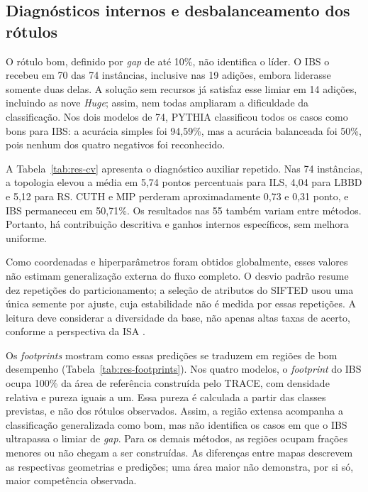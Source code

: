 \FloatBarrier
\subsection{Diagnósticos internos e desbalanceamento dos rótulos}
\label{sec:res-isa-diagnosticos}

O rótulo bom, definido por \textit{gap} de até 10\%, não identifica o líder.
O IBS o recebeu em 70 das 74 instâncias, inclusive nas 19 adições, embora
liderasse somente duas delas. A solução sem recursos já satisfaz esse
limiar em 14 adições, incluindo as nove \textit{Huge}; assim, nem todas
ampliaram a dificuldade da classificação. Nos dois modelos de 74,
PYTHIA classificou todos os casos como bons para IBS: a acurácia simples
foi 94,59\%, mas a acurácia balanceada foi 50\%, pois nenhum dos quatro
negativos foi reconhecido.

A Tabela~\ref{tab:res-cv} apresenta o diagnóstico auxiliar repetido.
Nas 74 instâncias, a topologia elevou a média em 5,74 pontos percentuais
para ILS, 4,04 para LBBD e 5,12 para RS. CUTH e MIP perderam aproximadamente
0,73 e 0,31 ponto, e IBS permaneceu em 50,71\%. Os resultados nas 55
também variam entre métodos. Portanto, há contribuição descritiva e ganhos
internos específicos, sem melhora uniforme.



Como coordenadas e hiperparâmetros foram obtidos globalmente, esses valores
não estimam generalização externa do fluxo completo. O desvio padrão
resume dez repetições do particionamento; a seleção de atributos do SIFTED
usou uma única semente por ajuste, cuja estabilidade não é medida por essas
repetições. A leitura deve considerar
a diversidade da base, não apenas altas taxas de acerto, conforme a
perspectiva da ISA \cite{SmithMilesMunoz2023}.

Os \textit{footprints} mostram como essas predições se traduzem em regiões
de bom desempenho (Tabela~\ref{tab:res-footprints}). Nos quatro modelos,
o \textit{footprint} do IBS ocupa 100\% da área de referência construída pelo TRACE,
com densidade relativa e pureza iguais a um. Essa pureza é calculada a
partir das classes previstas, e não dos rótulos observados. Assim, a região
extensa acompanha a classificação generalizada como bom, mas não identifica
os casos em que o IBS ultrapassa o limiar de \textit{gap}. Para os demais
métodos, as regiões ocupam frações menores ou não chegam a ser construídas.
As diferenças entre mapas descrevem as respectivas geometrias e predições;
uma área maior não demonstra, por si só, maior competência observada.

